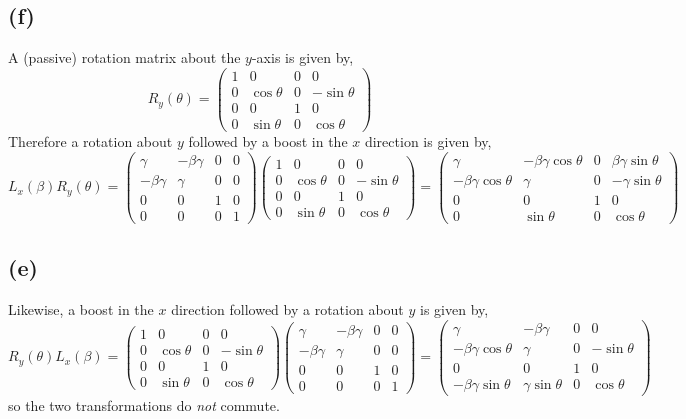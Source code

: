 \documentclass[11pt]{amsart}
\begin{document}
\subsection*{(f)}
A (passive) rotation matrix about the $y$-axis is given by,
\[R_y(\theta) = \begin{pmatrix}
1 & 0 & 0 & 0 \\
0 & \cos{\theta} & 0 & -\sin{\theta} \\
0 & 0 & 1 & 0 \\
0 & \sin{\theta} & 0 & \cos{\theta} 
\end{pmatrix}\]
Therefore a rotation about $y$ followed by a boost in the $x$ direction is given by,
\[ L_x(\beta) R_y(\theta) = \begin{pmatrix}
\gamma & - \beta \gamma & 0 & 0 \\
- \beta \gamma & \gamma & 0 & 0 \\
0 & 0 & 1 & 0 \\
0 & 0 & 0 & 1
\end{pmatrix}
\begin{pmatrix}
1 & 0 & 0 & 0 \\
0 & \cos{\theta} & 0 & -\sin{\theta} \\
0 & 0 & 1 & 0 \\
0 & \sin{\theta} & 0 & \cos{\theta} 
\end{pmatrix} = 
\begin{pmatrix}
\gamma & - \beta \gamma \cos{\theta} & 0 & \beta \gamma \sin{\theta}  \\
- \beta \gamma \cos{\theta} & \gamma & 0 & - \gamma \sin{\theta} \\
0 & 0 & 1 & 0 \\
0 & \sin{\theta} & 0 & \cos{\theta} 
\end{pmatrix}
\]
\subsection*{(e)}
Likewise, a boost in the $x$ direction followed by a rotation about $y$ is given by,
\[ R_y(\theta) L_x(\beta) = 
\begin{pmatrix}
1 & 0 & 0 & 0 \\
0 & \cos{\theta} & 0 & -\sin{\theta} \\
0 & 0 & 1 & 0 \\
0 & \sin{\theta} & 0 & \cos{\theta} 
\end{pmatrix}
\begin{pmatrix}
\gamma & - \beta \gamma & 0 & 0 \\
- \beta \gamma & \gamma & 0 & 0 \\
0 & 0 & 1 & 0 \\
0 & 0 & 0 & 1
\end{pmatrix} = 
\begin{pmatrix}
\gamma & - \beta \gamma  & 0 & 0  \\
- \beta \gamma \cos{\theta} & \gamma & 0 & - \sin{\theta} \\
0 & 0 & 1 & 0 \\
- \beta \gamma \sin{\theta}  & \gamma \sin{\theta} & 0 & \cos{\theta} 
\end{pmatrix}
\]
so the two transformations do \textit{not} commute. 
\end{document}
